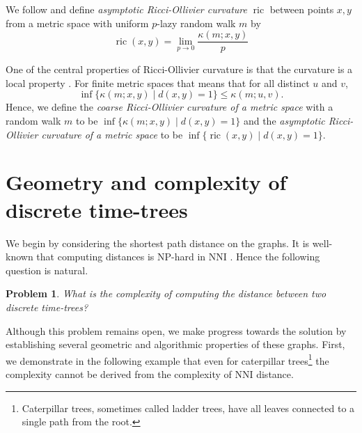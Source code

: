 \documentclass[11pt]{amsart}
\newtheorem{problem}[lemma]{Problem}
\theoremstyle{definition}
\newcommand{\nni}{\mathrm{NNI}}
\newcommand{\ric}{\operatorname{ric}}
\begin{document}
{We follow \textcite{Loisel2014-gu} and define \emph{asymptotic Ricci-Ollivier curvature} $\ric$ between points $x,y$ from a metric space with uniform $p$-lazy random walk $m$ by
\[
\ric(x,y) = \lim_{p\to0} \frac{\kappa(m;x,y)}{p}
\]

One of the central properties of Ricci-Ollivier curvature is that the curvature is a local property \autocite{Ollivier2009-cj}.
For finite metric spaces that means that for all distinct $u$ and $v$,
\[
\inf\{\kappa(m;x,y)\mid d(x,y) = 1\} \leq \kappa(m;u,v).
\]
Hence, we define the \emph{coarse Ricci-Ollivier curvature of a metric space} with a random walk $m$ to be $\inf\{\kappa(m;x,y)\mid d(x,y) = 1\}$ and the \emph{asymptotic Ricci-Ollivier curvature of a metric space} to be $\inf\{\ric(x,y)\mid d(x,y) = 1\}$.
}{}


\section{Geometry and complexity of discrete time-trees}

We begin by considering the shortest path distance on the graphs.
It is well-known that computing distances is NP-hard in $\nni$ \autocite{Dasgupta2000-xa}.
Hence the following question is natural.

\begin{problem}
\label{problemComplexity}
What is the complexity of computing the distance between two discrete time-trees?
\end{problem}

Although this problem remains open, we make progress towards the solution by establishing several geometric and algorithmic properties of these graphs.
First, we demonstrate in the following example that even for caterpillar trees\footnote{
Caterpillar trees, sometimes called ladder trees, have all leaves connected to a single path from the root.}
the complexity cannot be derived from the complexity of $\nni$ distance.
\end{document}
